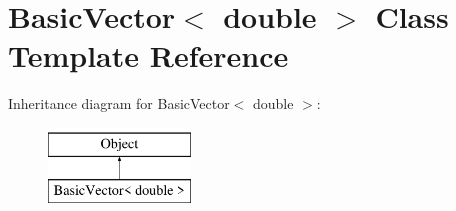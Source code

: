 \hypertarget{classBasicVector_3_01double_01_4}{}\section{Basic\+Vector$<$ double $>$ Class Template Reference}
\label{classBasicVector_3_01double_01_4}
Inheritance diagram for Basic\+Vector$<$ double $>$\+:\begin{figure}[H]
\begin{center}
\leavevmode
\includegraphics[height=2.000000cm]{classBasicVector_3_01double_01_4}
\end{center}
\end{figure}
